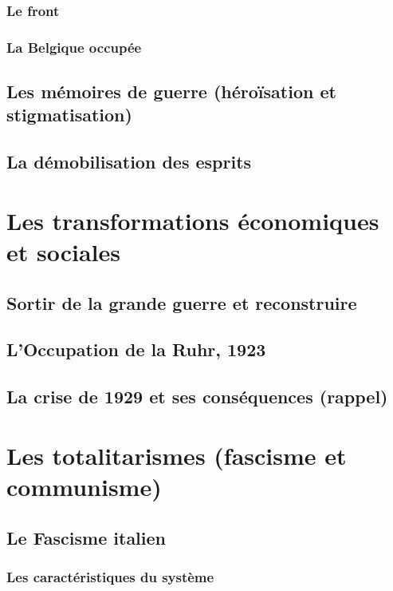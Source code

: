 \documentclass[12pt]{report}
\begin{document}
\subsection{Le front}

\subsection{La Belgique occupée}

\section{Les mémoires de guerre (héroïsation et stigmatisation)}

\section{La démobilisation des esprits}

\chapter{Les transformations économiques et sociales}

\section{Sortir de la grande guerre et reconstruire}

\section{L'Occupation de la Ruhr, 1923}

\section{La crise de 1929 et ses conséquences (rappel)}

\chapter{Les totalitarismes (fascisme et communisme)}

\section{Le Fascisme italien}

\subsection{Les caractéristiques du système}
\end{document}
